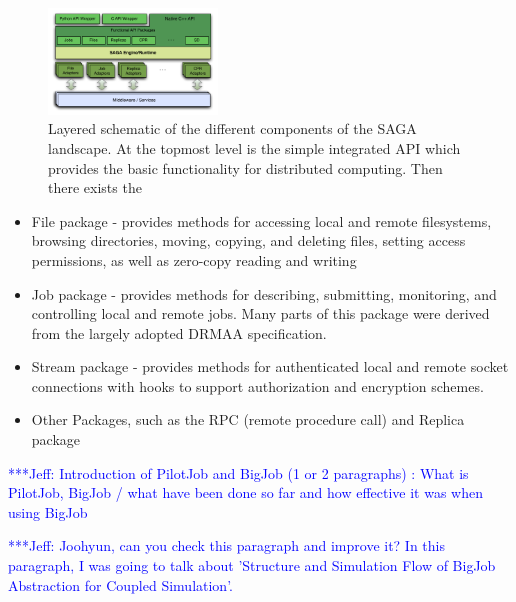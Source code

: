 \documentclass[conference,final]{IEEEtran}
\newcommand{\skonote}[1]{ {\textcolor{blue} { ***Jeff: #1 }}}
\newcommand{\skonote}[1]{}
\begin{document}
\begin{figure}[!ht]
  \begin{center}
      \includegraphics[width=0.40\textwidth]{stci_saga_figures-1.pdf}
  \end{center}
 \caption{\small Layered schematic of the different components
   of the SAGA landscape. At the topmost level is the simple integrated API which provides the basic functionality for distributed computing. Then there exists the} \label{sagalayer}
\end{figure}



\begin{itemize}
\item File package - provides methods for accessing local and remote
  filesystems, browsing directories, moving, copying, and deleting
  files, setting access permissions, as well as zero-copy reading and
  writing
\item Job package - provides methods for describing, submitting,
  monitoring, and controlling local and remote jobs. Many parts of
  this package were derived from the largely adopted
  DRMAA %
  specification.
\item Stream package - provides methods for authenticated local and
  remote socket connections with hooks to support authorization and
  encryption schemes.
\item Other Packages, such as the RPC (remote procedure call) and Replica
  package
\end{itemize}


\skonote{Introduction of PilotJob and BigJob (1 or 2 paragraphs) : What is PilotJob, BigJob / what have been done so far and how effective it was when using BigJob}



\skonote{Joohyun, can you check this paragraph and improve it? In this paragraph, I was going to talk about 'Structure and Simulation Flow of BigJob Abstraction for Coupled Simulation'.}
\end{document}
